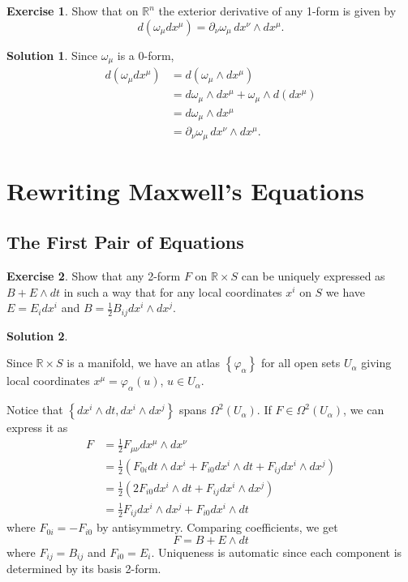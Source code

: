 \documentclass[11pt, a4paper]{article}
\theoremstyle{definition}
\newtheorem{ex}{Exercise}[part]
\newtheorem{sol}{Solution}[part]
\begin{document}
\begin{ex}

Show that on $\mathbb{R}^n$ the exterior derivative of any 1-form is given by
\[
    d(\omega_\mu dx^\mu) = \partial_\nu \omega_\mu \, dx^\nu \wedge dx^\mu.
\]

\end{ex}

\begin{sol}

Since $\omega_\mu$ is a 0-form,
\begin{align*}
    d(\omega_\mu dx^\mu) &= d(\omega_\mu \wedge dx^\mu) \\
        &= d\omega_\mu \wedge dx^\mu + \omega_\mu \wedge d(dx^\mu) \\
        &= d\omega_\mu \wedge dx^\mu \\
        &= \partial_\nu \omega_\mu \, dx^\nu \wedge dx^\mu.
\end{align*}

\end{sol}

\section{Rewriting Maxwell's Equations}

\subsection{The First Pair of Equations}

\begin{ex}

Show that any 2-form $F$ on $\mathbb{R} \times S$ can be uniquely expressed as $B + E \wedge dt$ in such a way that for any local coordinates $x^i$ on $S$ we have $E = E_i dx^i$ and $B = \frac{1}{2}B_{ij}dx^i \wedge dx^j$.

\end{ex}

\begin{sol}\label{sol:bplusedt}

Since $\mathbb{R} \times S$ is a manifold, we have an atlas $\left\{\varphi_\alpha\right\}$ for all open sets $U_\alpha$ giving local coordinates $x^\mu = \varphi_\alpha(u)$, $u \in U_\alpha$.

Notice that $\left\{dx^i \wedge dt, dx^i \wedge dx^j\right\}$ spans $\Omega^2(U_\alpha)$.
If $F \in \Omega^2(U_\alpha)$, we can express it as
\begin{align*}
    F &= \frac{1}{2}F_{\mu\nu}dx^\mu \wedge dx^\nu \\
      &= \frac{1}{2} (F_{0i} dt \wedge dx^i + F_{i0} dx^i \wedge dt + F_{ij} dx^i \wedge dx^j) \\
      &= \frac{1}{2} (2F_{i0} dx^i \wedge dt + F_{ij} dx^i \wedge dx^j) \\
      &= \frac{1}{2} F_{ij} dx^i \wedge dx^j + F_{i0} dx^i \wedge dt
\end{align*}
where $F_{0i} = -F_{i0}$ by antisymmetry. Comparing coefficients, we get
\[
    F = B + E \wedge dt
\]
where $F_{ij} = B_{ij}$ and $F_{i0} = E_i$. Uniqueness is automatic since each component is determined by its basis 2-form.

\end{sol}
\end{document}
